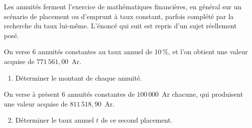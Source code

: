 \begin{annales}
Les annuités ferment l'exercice de mathématiques financières, en général sur
un scénario de placement ou d'emprunt à taux constant, parfois complété par
la recherche du taux lui-même. L'énoncé qui suit est repris d'un sujet
réellement posé.

On verse $6$ annuités constantes au taux annuel de $10\,\%$, et l'on obtient
une valeur acquise de $771\,561{,}00$~Ar.
\begin{enumerate}[label=\textbf{\alph*)}, leftmargin=*, itemsep=0.15em]
  \item Déterminer le montant de chaque annuité.
\end{enumerate}

On verse à présent $6$ annuités constantes de $100\,000$~Ar chacune, qui
produisent une valeur acquise de $811\,518{,}90$~Ar.
\begin{enumerate}[label=\textbf{\alph*)}, leftmargin=*, itemsep=0.15em]
  \setcounter{enumii}{1}
  \item Déterminer le taux annuel $t$ de ce second placement.
\end{enumerate}


\end{annales}
